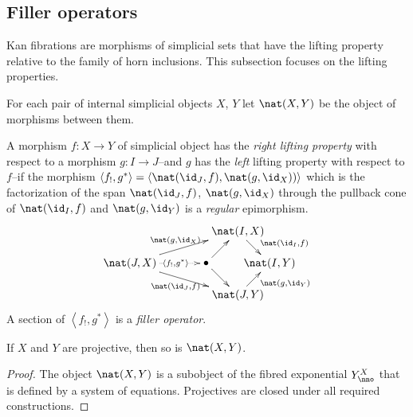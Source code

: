 \documentclass{tac}
\newcommand\hide[1]{}
\newcommand\ri{^*}
\newcommand\bang{!}
\newcommand\of{:}
\newcommand\tuplet[1]{\left\langle #1 \right\rangle}
\begin{document}
\subsection{Filler operators} %
Kan fibrations are morphisms of simplicial sets that have the lifting property relative to the family of horn inclusions. This subsection focuses on the lifting properties.

\hide{
When dealing with projectives, the properties 'there is a lifting' and having a lifting operator coincide.

We just need to be careful about non projective simplicial objects--these newbies may have unexpected properties.

Check when being projective plays a role.
}

\begin{definition} For each pair of internal simplicial objects $X$, $Y$ let $\nat(X,Y)$ be the object of morphisms between them.

A morphism $f\of X\to Y$ of simplicial object has the \emph{right lifting property} with respect to a morphism $g\of I\to J$--and $g$ has the \emph{left} lifting property with respect to $f$--if the morphism $\tuplet{f_!,g\ri} = \tuplet{\nat(\id_J,f),\nat(g,\id_X))}$ 
which is the factorization of the span $\nat(\id_J,f)$, $\nat(g,\id_X)$ through the pullback cone of $\nat(\id_I,f)$ and $\nat(g,\id_Y)$
is a \emph{regular} epimorphism.
\[\xy
(34,20)*+{\nat(I,X)}="top",(0,10)*+{\nat(J,X)}="left",(24,10)*+{\bullet}="middle",(44,10)*+{\nat(I,Y)}="right",(34,0)*+{\nat(J,Y)}="bottom"
\ar^{\nat(g,\id_X)} "left";"top" \ar@{.>}|(.6){\tuplet{f_!,g\ri}} "left";"middle" \ar_{\nat(\id_J,f)} "left";"bottom" \ar "middle";"bottom"
\ar "middle";"top" \ar^(.6){\nat(\id_I,f)} "top";"right" \ar_(.6){\nat(g,\id_Y)} "bottom";"right"
\endxy\]
A section of $\tuplet{f_\bang,g\ri}$ is a \emph{filler operator}.\label{lifting}
\end{definition}

\hide{explain why this is important}
\begin{lemma} If $X$ and $Y$ are projective, then so is $\nat(X,Y)$. \end{lemma}

\begin{proof} The object $\nat(X,Y)$ is a subobject of the fibred exponential $Y^X_\nno$ that is defined by a system of equations. Projectives are closed under all required constructions.
\end{proof}
\end{document}
